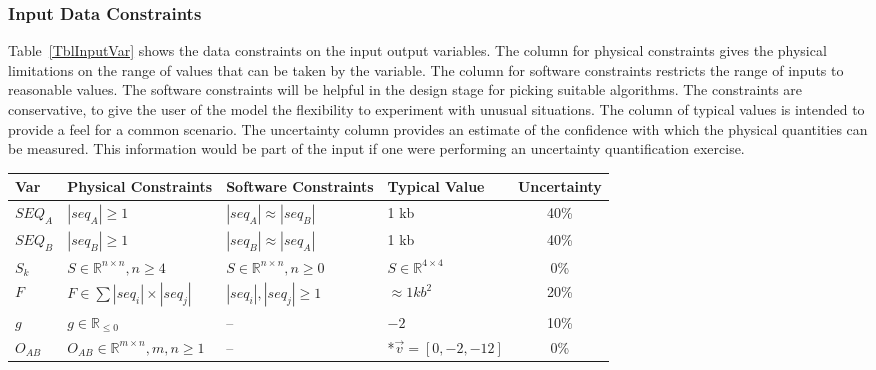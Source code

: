 \documentclass[12pt]{article}
\begin{document}


\subsubsection{Input Data Constraints} \label{sec_DataConstraints}    

Table~\ref{TblInputVar} shows the data constraints on the input output
variables.  The column for physical constraints gives the physical limitations
on the range of values that can be taken by the variable.  The column for
software constraints restricts the range of inputs to reasonable values.  The
software constraints will be helpful in the design stage for picking suitable
algorithms.  The constraints are conservative, to give the user of the model the
flexibility to experiment with unusual situations.  The column of typical values
is intended to provide a feel for a common scenario.  The uncertainty column
provides an estimate of the confidence with which the physical quantities can be
measured.  This information would be part of the input if one were performing an
uncertainty quantification exercise.


\begin{table}[!h]
  \caption{Input Variables} \label{TblInputVar}
  \renewcommand{\arraystretch}{1.2}
\noindent \begin{longtable*}{l l l l c} 
  \toprule
  \textbf{Var} & \textbf{Physical Constraints} & \textbf{Software Constraints} &
                             \textbf{Typical Value} & \textbf{Uncertainty}\\
  \midrule 
  $SEQ_A$ & $|{seq_A}| \geq 1$ & $|seq_A| \approx |seq_B|$ & 1 kb & 40\%
  \\
  $SEQ_B$ & $|{seq_B}| \geq 1$ & $|seq_B| \approx |seq_A|$ & 1 kb & 40\%
  \\
  $S_k$ & $S \in \mathbb{R}^{n \times n}, n \geq 4$ & $S \in \mathbb{R}^{n \times n}, n \geq 0$ & $S \in \mathbb{R}^{4 \times 4}$& 0\%
  \\
  $F$ & $F \in \sum|seq_i| \times |seq_j|$ & $|seq_i|, |seq_j| \geq 1$ & $\approx 1 kb^2$ & 20\%
  \\
  $g$ & $g \in \mathbb{R}_{\leq 0}$ & -- & $-2$ & 10\%
  \\
  $O_{AB}$ & $O_{AB} \in \mathbb{R}^{m \times n}, m,n \geq 1$ & -- & *$\vec{v} = [0,-2,-12]$ & 0\%
  \\
  \bottomrule
\end{longtable*}
\end{table}
\end{document}
